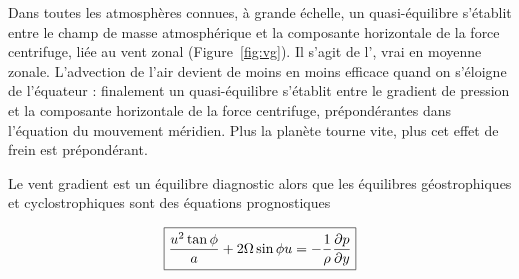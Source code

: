 \sk
Dans toutes les atmosphères connues, à grande échelle, un quasi-équilibre s'établit entre le champ de masse atmosphérique et la composante horizontale de la force centrifuge, liée au vent zonal (Figure~\ref{fig:vg}). Il s'agit de l', vrai en moyenne zonale. L'advection de l'air devient de moins en moins efficace quand on s'éloigne de l'équateur : finalement un quasi-équilibre s'établit entre le gradient de pression et la composante horizontale de la force centrifuge, prépondérantes dans l'équation du mouvement méridien. Plus la planète tourne vite, plus cet effet de frein est prépondérant. 

\sk
Le vent gradient est un équilibre diagnostic alors que les équilibres géostrophiques et cyclostrophiques sont des équations prognostiques

\[
\boxed{\dfrac{u^2\tan\phi}{a} + 2\Omega\sin\phi u = -\dfrac{1}{\rho}\dfrac{\partial p }{\partial y}}
\]


